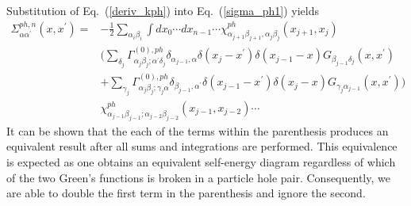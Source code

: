 Substitution of Eq.~(\ref{deriv_kph}) into Eq.~(\ref{sigma_ph1})
yields
\begin{equation}
\begin{split}
\Sigma^{ph,n}_{\alpha \alpha^{\prime}}(x,x^{\prime})
=&- \frac{1}{2} \sum_{\alpha_i \beta_i} \int dx_0 \cdots dx_{n-1} \cdots
 \chi^{ph}_{\alpha_{j+1} \beta_{j+1},\alpha_j \beta_j}(x_{j+1},x_j) \\
& \big( \sum_{\delta_j} 
\Gamma^{(0),ph}_{\alpha_j \beta_j;\alpha^{\prime}\delta_j} 
\delta_{\alpha_{j-1},\alpha}
\delta(x_j - x^{\prime}) \delta(x_{j-1}-x) 
G_{\beta_{j-1}\delta_j}(x,x^{\prime}) 
\\
& + \sum_{\gamma_j}
\Gamma^{(0),ph}_{\alpha_j \beta_j;\gamma_j\alpha}
 \delta_{\beta_{j-1},\alpha^{\prime}}
\delta(x_{j-1} - x^{\prime}) \delta(x_j - x)
G_{\gamma_j \alpha_{j-1}}(x,x^{\prime})
 \big)
\\
& \chi^{ph}_{\alpha_{j-1} \beta_{j-1}; \alpha_{j-2}\beta_{j-2}}(x_{j-1},
x_{j-2}) \cdots
\end{split}
\end{equation}
It can be shown that the each of the terms within the parenthesis
produces an equivalent result after all sums
and integrations are performed.  This equivalence is
expected as one obtains an equivalent self-energy
diagram regardless of which of the two Green's functions
is broken in a particle hole pair.
Consequently, we are able to double the first term
in the parenthesis and ignore the second.

